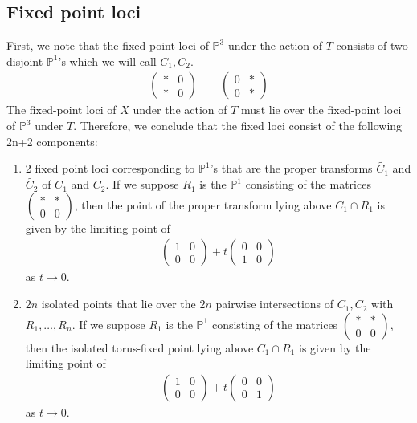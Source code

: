 \documentclass[12 pt, reqno]{amsart}
\theoremstyle{definition}
\newcommand{\mb}{\mathbb}
\newcommand{\wt}{\widetilde}
\begin{document}
\subsection{Fixed point loci}
First, we note that the fixed-point loci of $\mb{P}^3$ under the
action of $T$ consists of two disjoint $\mb{P}^1$'s which we will call
$C_1,C_2$.
\begin{align*}
\begin{pmatrix}
\ast & 0\\
\ast & 0
\end{pmatrix}
\qquad
\begin{pmatrix}
0 & \ast \\
0 & \ast
\end{pmatrix}
\end{align*}
The fixed-point loci of $X$ under the action of $T$ must lie over the
fixed-point loci of $\mb{P}^3$ under $T$. Therefore, we conclude that the fixed loci consist of the following 2n+2 components:
\begin{enumerate}
\item 2 fixed point loci corresponding to $\mb{P}^1$'s that are the
  proper transforms $\wt{C_1}$ and $\wt{C_2}$ of $C_1$ and $C_2$. If we suppose $R_1$ is the $\mathbb{P}^1$ consisting of the matrices
  $\begin{pmatrix} \ast & \ast \\ 0 & 0\end{pmatrix}$, then the point
  of the proper transform lying above $C_1\cap R_1$ is given by the
  limiting point of
\begin{align*}
\begin{pmatrix} 
1 & 0\\
0 & 0
\end{pmatrix} 
+ t 
\begin{pmatrix} 
0 & 0\\
1 & 0
\end{pmatrix}
\end{align*}
as $t\to 0$. 

\item $2n$ isolated points that lie over the $2n$ pairwise
  intersections of $C_1,C_2$ with $R_1,\ldots,R_n$. If we suppose
  $R_1$ is the $\mathbb{P}^1$ consisting of the matrices
  $\begin{pmatrix} \ast & \ast \\ 0 & 0\end{pmatrix}$, then the
  isolated torus-fixed point lying above $C_1\cap R_1$ is given by the
  limiting point of
\begin{align*}
\begin{pmatrix} 
1 & 0\\
0 & 0
\end{pmatrix} 
+ t 
\begin{pmatrix} 
0 & 0\\
0 & 1
\end{pmatrix}
\end{align*}
as $t\to 0$. 
\end{enumerate}
\end{document}
